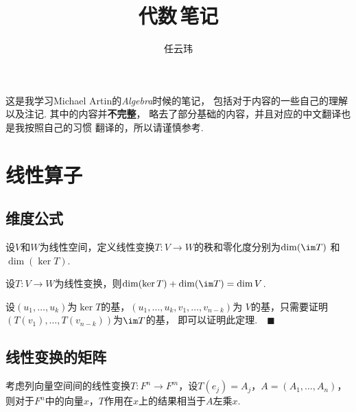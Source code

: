 

\title{代数$\,$笔记}
\author{任云玮}
\date{}


\maketitle
\tableofcontents
\newpage

  这是我学习Michael Artin的\textit{Algebra}时候的笔记，
  包括对于内容的一些自己的理解以及注记. 其中的内容并\textbf{不完整}，
  略去了部分基础的内容，并且对应的中文翻译也是我按照自己的习惯
  翻译的，所以请谨慎参考.



\newpage


\newpage


\newpage
\section{线性算子}

\subsection{维度公式}

  \begin{defi}
    设$V$和$W$为线性空间，定义线性变换$T:V\to W$的秩和零化度分别为$\dim(\im T)$
    和$\dim(\ker T)$.
  \end{defi}

  \begin{thm}[维度公式]
    设$T:V\to W$为线性变换，则$\dim(\ker T)+\dim(\im T)=\dim V$.
  \end{thm}
  \proof
    设$(u_1,\dots,u_k)$为$\ker T$的基，$(u_1,\dots,u_k, v_1,\dots,v_{n-k})$为
    $V$的基，只需要证明$(T(v_1),\dots, \allowbreak T(v_{n-k}))$为$\im T$的基，
    即可以证明此定理.$\quad\blacksquare$

  \begin{cor}

  \end{cor}

\subsection{线性变换的矩阵}
  \begin{lemma}
    考虑列向量空间间的线性变换$T:F^n\to F^m$，设$T(e_j)=A_j$，$A=(A_1,\dots,A_n)$，
    则对于$F^n$中的向量$x$，$T$作用在$x$上的结果相当于$A$左乘$x$.
  \end{lemma}

